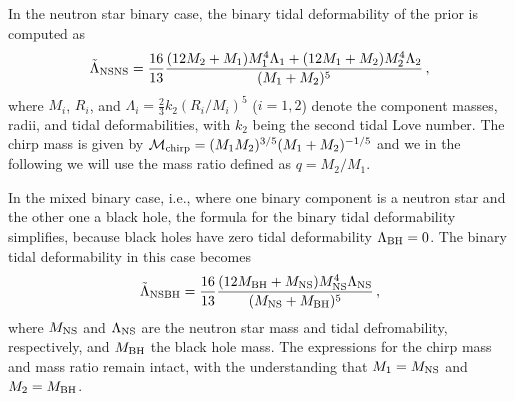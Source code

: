 \documentclass[twocolumn]{aastex631}
\begin{document}
In the neutron star binary case, the binary tidal deformability of the prior is computed as
\begin{equation} 
 \tilde{\Lambda}_{\rm NSNS} = \frac{16}{13} \frac{ (12M_2 + M_1) M_1^4 \Lambda_1 + (12M_1 + M_2) M_2^4 \Lambda_2}{(M_1 + M_2)^5}\,,
\end{equation}
where $M_i$, $R_i$, and $\Lambda_i = \frac{2}{3} k_2 \left( R_i/M_i \right)^5$ ($i=1,2$) denote the component masses, radii, and tidal deformabilities, with $k_2$ being the second tidal Love number.
The chirp mass is given by $\mathcal{M}_{\rm chirp} = (M_1 M_2)^{3/5} (M_1+M_2)^{-1/5}$ and we in the following we will use the mass ratio defined as $q = M_2/M_1$.
	
In the mixed binary case, i.e., where one binary component is a neutron star and the other one a black hole, the formula for the binary tidal deformability simplifies, because black holes have zero tidal deformability $\Lambda_{\rm BH}=0$.
The binary tidal deformability in this case becomes
\begin{equation} 
 \tilde{\Lambda}_{\rm NSBH} = \frac{16}{13} \frac{ (12M_{\rm BH} + M_{\rm NS}) M_{\rm NS}^4 \Lambda_{\rm NS}}{(M_{\rm NS} + M_{\rm BH})^5}\,,
 \end{equation}
where $M_{\rm NS}$ and $\Lambda_{\rm NS}$ are the neutron star mass and tidal defromability, respectively, and $M_{\rm BH}$ the black hole mass. 
The expressions for the chirp mass and mass ratio remain intact, with the understanding that $M_1=M_{\rm NS}$ and $M_2=M_{\rm BH}$. 
	
\end{document}
